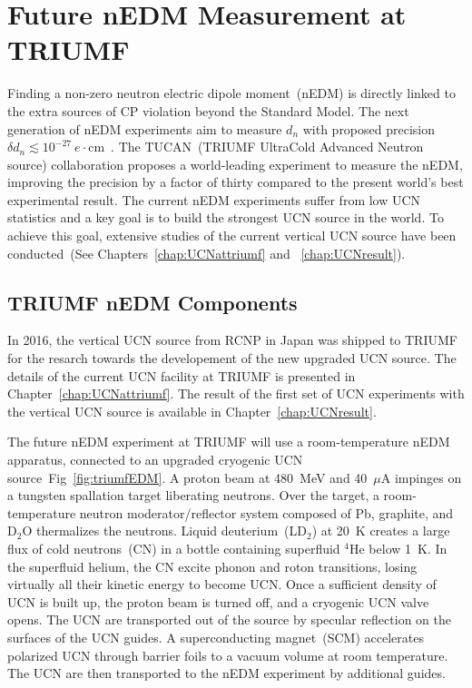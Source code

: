 \chapter{Future nEDM Measurement at TRIUMF\label{chap:nedm}}

Finding a non-zero neutron electric dipole moment~(nEDM) is directly
linked to the extra sources of CP violation beyond the Standard Model.
The next generation of nEDM experiments aim to measure $d_n$ with
proposed precision
$\delta d_n\lesssim
10^{-27}~e\cdot$cm~\cite{serebrov2014new,serebrov2011supersource,Kirch_talk,baker2011search,altarev2012next,golub1994neutron,ito2007plans,picker2017minuscule}.
The TUCAN~(TRIUMF UltraCold Advanced Neutron source) collaboration
proposes a world-leading experiment to measure the nEDM, improving the
precision by a factor of thirty compared to the present world’s best
experimental result. The current nEDM experiments suffer from low UCN
statistics and a key goal is to build the strongest UCN source in the
world. To achieve this goal, extensive studies of the current vertical
UCN source have been conducted~(See Chapters~\ref{chap:UCNattriumf}
and ~\ref{chap:UCNresult}).



\section{TRIUMF nEDM Components~\label{sec:triumfnedm}}
In 2016, the vertical UCN source from RCNP in Japan was shipped to
TRIUMF for the resarch towards the developement of the new upgraded
UCN source.  The details of the current UCN facility at TRIUMF is
presented in Chapter~\ref{chap:UCNattriumf}. The result of the first
set of UCN experiments with the vertical UCN source is available in
Chapter~\ref{chap:UCNresult}.



The future nEDM experiment at TRIUMF will use a room-temperature nEDM
apparatus, connected to an upgraded cryogenic UCN
source~Fig~\ref{fig:triumfEDM}. A proton beam at 480~MeV and 40~$\mu$A
impinges on a tungsten spallation target liberating neutrons. Over the
target, a room-temperature neutron moderator/reflector system composed
of Pb, graphite, and D$_2$O thermalizes the neutrons. Liquid
deuterium~(LD$_2$) at 20~K creates a large flux of cold neutrons~(CN)
in a bottle containing superfluid $^4$He below 1~K. In the superfluid
helium, the CN excite phonon and roton transitions, losing virtually
all their kinetic energy to become UCN. Once a sufficient density of
UCN is built up, the proton beam is turned off, and a cryogenic UCN
valve opens. The UCN are transported out of the source by specular
reflection on the surfaces of the UCN guides. A superconducting
magnet~(SCM) accelerates polarized UCN through barrier foils to a
vacuum volume at room temperature. The UCN are then transported to the
nEDM experiment by additional guides.



